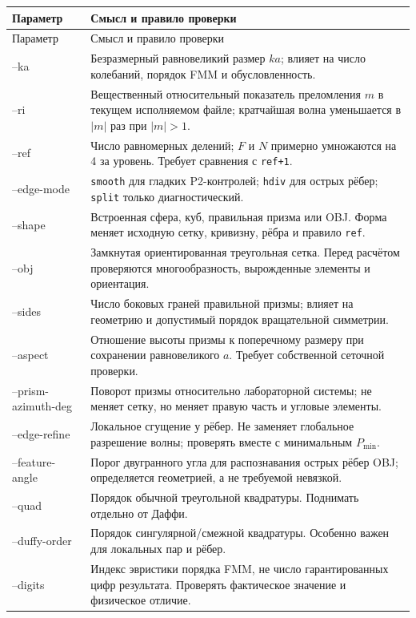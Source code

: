 \documentclass[12pt,a4paper]{article}
\begin{document}
\small
\begin{longtable}{>{\ttfamily\raggedright\arraybackslash}p{}p{}}
\toprule
\normalfont Параметр & Смысл и правило проверки \\
\midrule
\endfirsthead
\toprule
\normalfont Параметр & Смысл и правило проверки \\
\midrule
\endhead
--ka & Безразмерный равновеликий размер $ka$; влияет на число колебаний, порядок FMM и обусловленность.\\
--ri & Вещественный относительный показатель преломления $m$ в текущем исполняемом файле; кратчайшая волна уменьшается в $|m|$ раз при $|m|>1$.\\
--ref & Число равномерных делений; $F$ и $N$ примерно умножаются на 4 за уровень. Требует сравнения с \texttt{ref+1}.\\
--edge-mode & \texttt{smooth} для гладких P2-контролей; \texttt{hdiv} для острых рёбер; \texttt{split} только диагностический.\\
--shape & Встроенная сфера, куб, правильная призма или OBJ. Форма меняет исходную сетку, кривизну, рёбра и правило \texttt{ref}.\\
--obj & Замкнутая ориентированная треугольная сетка. Перед расчётом проверяются многообразность, вырожденные элементы и ориентация.\\
--sides & Число боковых граней правильной призмы; влияет на геометрию и допустимый порядок вращательной симметрии.\\
--aspect & Отношение высоты призмы к поперечному размеру при сохранении равновеликого $a$. Требует собственной сеточной проверки.\\
--prism-azimuth-deg & Поворот призмы относительно лабораторной системы; не меняет сетку, но меняет правую часть и угловые элементы.\\
--edge-refine & Локальное сгущение у рёбер. Не заменяет глобальное разрешение волны; проверять вместе с минимальным $P_{\min}$.\\
--feature-angle & Порог двугранного угла для распознавания острых рёбер OBJ; определяется геометрией, а не требуемой невязкой.\\
--quad & Порядок обычной треугольной квадратуры. Поднимать отдельно от Даффи.\\
--duffy-order & Порядок сингулярной/смежной квадратуры. Особенно важен для локальных пар и рёбер.\\
--digits & Индекс эвристики порядка FMM, не число гарантированных цифр результата. Проверять фактическое значение и физическое отличие.\\

\end{longtable}
\end{document}
